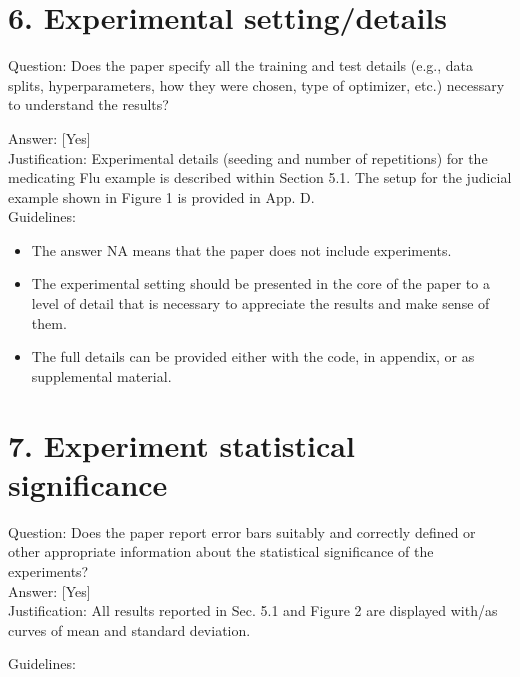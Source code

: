 \documentclass[10pt]{article}
\begin{document}
\section*{6. Experimental setting/details}
Question: Does the paper specify all the training and test details (e.g., data splits, hyperparameters, how they were chosen, type of optimizer, etc.) necessary to understand the results?

Answer: [Yes]\\
Justification: Experimental details (seeding and number of repetitions) for the medicating Flu example is described within Section 5.1. The setup for the judicial example shown in Figure 1 is provided in App. D.\\
Guidelines:

\begin{itemize}
  \item The answer NA means that the paper does not include experiments.
  \item The experimental setting should be presented in the core of the paper to a level of detail that is necessary to appreciate the results and make sense of them.
  \item The full details can be provided either with the code, in appendix, or as supplemental material.
\end{itemize}

\section*{7. Experiment statistical significance}
Question: Does the paper report error bars suitably and correctly defined or other appropriate information about the statistical significance of the experiments?\\[0pt]
Answer: [Yes]\\
Justification: All results reported in Sec. 5.1 and Figure 2 are displayed with/as curves of mean and standard deviation.

Guidelines:
\end{document}
